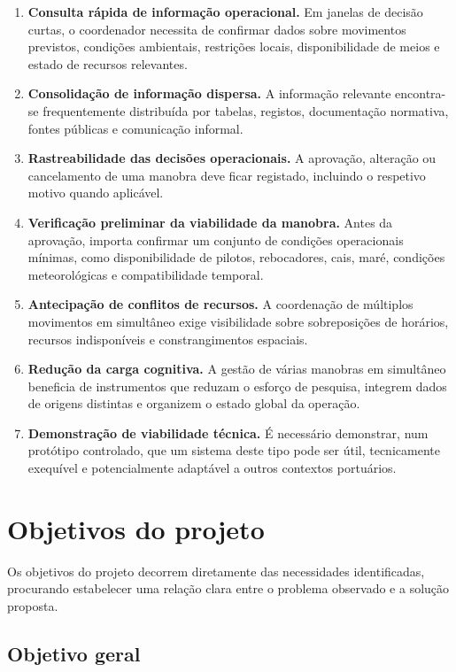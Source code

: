 \documentclass[a4paper,12pt]{report}
\begin{document}
\begin{enumerate}[label=\arabic*.]
    \item \textbf{Consulta rápida de informação operacional.} Em janelas de decisão curtas, o coordenador necessita de confirmar dados sobre movimentos previstos, condições ambientais, restrições locais, disponibilidade de meios e estado de recursos relevantes.
    \item \textbf{Consolidação de informação dispersa.} A informação relevante encontra-se frequentemente distribuída por tabelas, registos, documentação normativa, fontes públicas e comunicação informal.
    \item \textbf{Rastreabilidade das decisões operacionais.} A aprovação, alteração ou cancelamento de uma manobra deve ficar registado, incluindo o respetivo motivo quando aplicável.
    \item \textbf{Verificação preliminar da viabilidade da manobra.} Antes da aprovação, importa confirmar um conjunto de condições operacionais mínimas, como disponibilidade de pilotos, rebocadores, cais, maré, condições meteorológicas e compatibilidade temporal.
    \item \textbf{Antecipação de conflitos de recursos.} A coordenação de múltiplos movimentos em simultâneo exige visibilidade sobre sobreposições de horários, recursos indisponíveis e constrangimentos espaciais.
    \item \textbf{Redução da carga cognitiva.} A gestão de várias manobras em simultâneo beneficia de instrumentos que reduzam o esforço de pesquisa, integrem dados de origens distintas e organizem o estado global da operação.
    \item \textbf{Demonstração de viabilidade técnica.} É necessário demonstrar, num protótipo controlado, que um sistema deste tipo pode ser útil, tecnicamente exequível e potencialmente adaptável a outros contextos portuários.
\end{enumerate}

\section{Objetivos do projeto}

Os objetivos do projeto decorrem diretamente das necessidades identificadas, procurando estabelecer uma relação clara entre o problema observado e a solução proposta.

\subsection{Objetivo geral}
\end{document}
